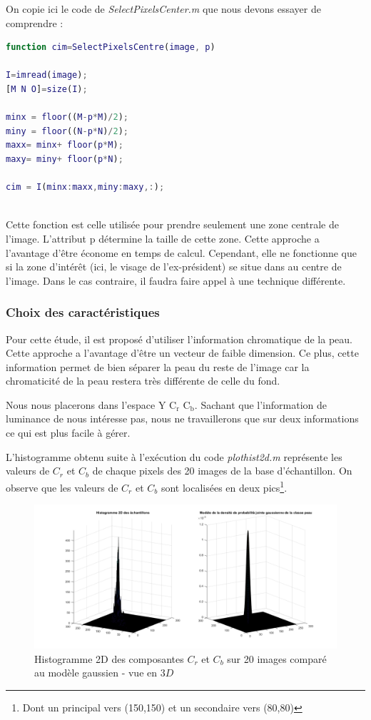 \documentclass[11pt,a4paper]{article}
\begin{document}
On copie ici le code de \emph{SelectPixelsCenter.m} que nous devons essayer de comprendre :
 
\noindent\hrulefill
\begin{lstlisting}[language=matlab]
function cim=SelectPixelsCentre(image, p)

I=imread(image);
[M N O]=size(I);

minx = floor((M-p*M)/2);
miny = floor((N-p*N)/2);
maxx= minx+ floor(p*M);
maxy= miny+ floor(p*N);

cim = I(minx:maxx,miny:maxy,:);
\end{lstlisting}
\noindent\hrulefill
\\
Cette fonction est celle utilisée pour prendre seulement une zone centrale de l'image. L'attribut p détermine la taille de cette zone.
Cette approche a l'avantage d'être économe en temps de calcul. Cependant, elle ne fonctionne que si la zone d'intérêt (ici, le visage de l'ex-président) se situe dans au centre de l'image. Dans le cas contraire, il faudra faire appel à une technique différente.

\subsubsection{Choix des caractéristiques}
Pour cette étude, il est proposé d'utiliser l'information chromatique de la peau. Cette approche a l'avantage d'être un vecteur de faible dimension. Ce plus, cette information permet de bien séparer la peau du reste de l'image car la chromaticité de la peau restera très différente de celle du fond.

Nous nous placerons dans l'espace Y C$_\text{r}$ C$_\text{b}$. Sachant que l'information de luminance de nous intéresse pas, nous ne travaillerons que sur deux informations ce qui est plus facile à gérer.

L'histogramme obtenu suite à l'exécution du code \emph{plothist2d.m} représente les valeurs de $C_r$ et $C_b$ de chaque pixels des 20 images de la base d'échantillon. On observe que les valeurs de $C_r$ et $C_b$ sont localisées en deux pics\footnote{Dont un principal vers (150,150) et un secondaire vers (80,80)}.

\begin{figure}[H]
\center
\includegraphics[width=15cm]{exo2_hist2D.png}
\caption{Histogramme 2D des composantes $C_r$ et $C_b$ sur 20 images comparé au modèle gaussien - vue en $3D$}
\label{fig.exo2_histogramme2D}
\end{figure} 
\end{document}
